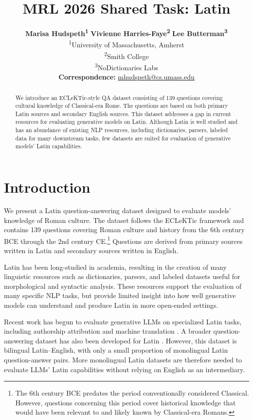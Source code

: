 \documentclass[11pt]{article}
\title{MRL 2026 Shared Task: Latin}
\author{
  \textbf{Marisa Hudspeth\textsuperscript{1}} \quad
  \textbf{Vivienne Harries-Faye\textsuperscript{2}} \quad
  \textbf{Lee Butterman\textsuperscript{3}} 
\\
 \textsuperscript{1}University of Massachusetts, Amherst \\
  \textsuperscript{2}Smith College \\
  \textsuperscript{3}NoDictionaries Labs
  \\
  \small{
    \textbf{Correspondence:} \href{mailto:mhudspeth@cs.umass.edu}{mhudspeth@cs.umass.edu}
  }
}
\begin{document}
\maketitle
\begin{abstract}
We introduce an ECLeKTic-style QA dataset consisting of 139 questions covering cultural knowledge of Classical-era Rome. The questions are based on both primary Latin sources and secondary English sources. This dataset addresses a gap in current resources for evaluating generative models on Latin. Although Latin is well studied and has an abundance of existing NLP resources, including dictionaries, parsers, labeled data for many downstream tasks, few datasets are suited for evaluation of generative models' Latin capabilities. 
\end{abstract}

\section{Introduction}


We present a Latin question-answering dataset designed to evaluate models' knowledge of Roman culture. The dataset follows the ECLeKTic framework \cite{goldman2025eclekticnovelchallengeset} and contains 139 questions covering Roman culture and history from the 6th century BCE through the 2nd century CE.\footnote{The 6th century BCE predates the period conventionally considered Classical. However, questions concerning this period cover historical knowledge that would have been relevant to and likely known by Classical-era Romans.} Questions are derived from primary sources written in Latin and secondary sources written in English.

Latin has been long-studied in academia, resulting in the creation of many linguistic resources such as dictionaries, parsers, and labeled datasets useful for morphological and syntactic analysis. These resources support the evaluation of many specific NLP tasks, but provide limited insight into how well generative models can understand and produce Latin in more open-ended settings.  

Recent work has begun to evaluate generative LLMs on specialized Latin tasks, including authorship attribution \cite{gorovaia-etal-2024-sui} and machine translation \cite{volk-etal-2024-llm}. A broader question-answering dataset has also been developed for Latin \cite{hudspeth-etal-2026-respondeoqa}. However, this dataset is bilingual Latin--English, with only a small proportion of monolingual Latin question-answer pairs. More monolingual Latin datasets are therefore needed to evaluate LLMs' Latin capabilities without relying on English as an intermediary.
\end{document}
